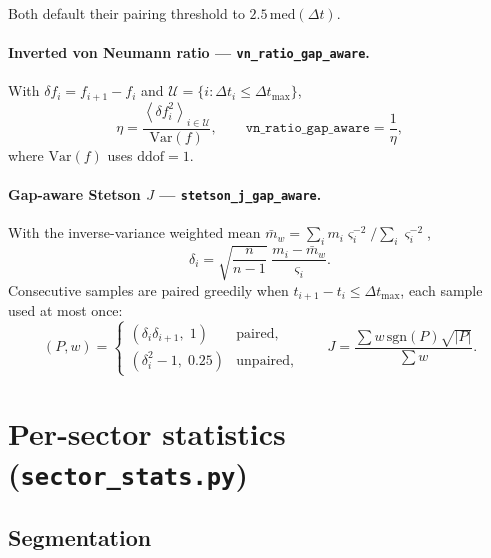 \documentclass[11pt]{article}
\begin{document}
Both default their pairing threshold to $2.5\,\mathrm{med}(\Delta t)$.

\paragraph{Inverted von Neumann ratio --- \texttt{vn\_ratio\_gap\_aware}.}
With $\delta f_i = f_{i+1}-f_i$ and $\mathcal{U} = \{i : \Delta t_i \le \Delta t_{\max}\}$,
%
\begin{equation}
  \eta = \frac{\left\langle \delta f_i^{2}\right\rangle_{i \in \mathcal{U}}}
              {\mathrm{Var}(f)}, \qquad
  \texttt{vn\_ratio\_gap\_aware} = \frac{1}{\eta},
  \label{eq:vn}
\end{equation}
%
where $\mathrm{Var}(f)$ uses $\mathrm{ddof}=1$.

\paragraph{Gap-aware Stetson $J$ --- \texttt{stetson\_j\_gap\_aware}.}
With the inverse-variance weighted mean
$\bar{m}_w = \sum_i m_i \varsigma_i^{-2} / \sum_i \varsigma_i^{-2}$,
%
\begin{equation}
  \delta_i = \sqrt{\frac{n}{n-1}}\;\frac{m_i - \bar{m}_w}{\varsigma_i} .
  \label{eq:stetdelta}
\end{equation}
%
Consecutive samples are paired greedily when
$t_{i+1}-t_i \le \Delta t_{\max}$, each sample used at most once:
%
\begin{equation}
  (P, w) =
  \begin{cases}
    \left(\delta_i \delta_{i+1},\; 1\right)      & \text{paired},\\[4pt]
    \left(\delta_i^{2} - 1,\; 0.25\right)        & \text{unpaired},
  \end{cases}
  \qquad
  J = \frac{\sum w \,\mathrm{sgn}(P)\sqrt{|P|}}{\sum w} .
  \label{eq:stetson}
\end{equation}

\section{Per-sector statistics (\texttt{sector\_stats.py})}

\subsection{Segmentation}
\end{document}
